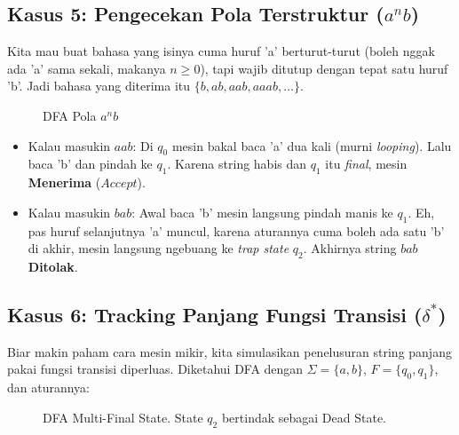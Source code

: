\documentclass[12pt,a4paper]{article}
\begin{document}
\subsection{Kasus 5: Pengecekan Pola Terstruktur ($a^n b$)}
Kita mau buat bahasa yang isinya cuma huruf 'a' berturut-turut (boleh nggak ada 'a' sama sekali, makanya $n \ge 0$), tapi wajib ditutup dengan tepat satu huruf 'b'.
Jadi bahasa yang diterima itu $\{b, ab, aab, aaab, \dots\}$.

\begin{figure}[h]
    \centering
    \caption{DFA Pola $a^n b$}
\end{figure}
\begin{itemize}
    \item Kalau masukin $aab$: Di $q_0$ mesin bakal baca 'a' dua kali (murni \textit{looping}). Lalu baca 'b' dan pindah ke $q_1$. Karena string habis dan $q_1$ itu \textit{final}, mesin \textbf{Menerima} ($Accept$).
    \item Kalau masukin $bab$: Awal baca 'b' mesin langsung pindah manis ke $q_1$. Eh, pas huruf selanjutnya 'a' muncul, karena aturannya cuma boleh ada satu 'b' di akhir, mesin langsung ngebuang ke \textit{trap state} $q_2$. Akhirnya string $bab$ \textbf{Ditolak}.
\end{itemize}

\subsection{Kasus 6: Tracking Panjang Fungsi Transisi ($\delta^*$)}
Biar makin paham cara mesin mikir, kita simulasikan penelusuran string panjang pakai fungsi transisi diperluas.
Diketahui DFA dengan $\Sigma=\{a,b\}$, $F=\{q_0, q_1\}$, dan aturannya:

\begin{figure}[h]
    \centering
    \caption{DFA Multi-Final State. State $q_2$ bertindak sebagai Dead State.}
\end{figure}
\end{document}
